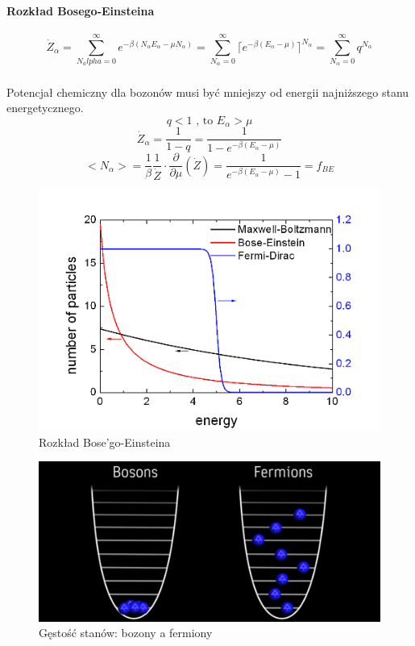 \documentclass{article}
\begin{document}
		\paragraph{Rozkład Bosego-Einsteina}
		\begin{equation}
		\dot{Z}_\alpha = \sum_{N_alpha = 0}^{\infty} e^{-\beta(N_\alpha E_\alpha - \mu N_\alpha)} = 
		\sum_{N_\alpha = 0}^{\infty} \lceil e^{-\beta (E_\alpha - \mu)} \rceil^{N_\alpha} = 
		\sum_{N_\alpha=0}^{\infty}q^{N_\alpha}
		\end{equation}
		\subparagraph{}Potencjał chemiczny dla bozonów musi być mniejszy od energii najniższego stanu energetycznego.
		\begin{equation}
		q < 1 \text{ , to } E_\alpha > \mu
		\end{equation}
		\begin{equation}
		\dot{Z}_\alpha = \frac{1}{1-q} = \frac{1}{1 - e^{-\beta (E_\alpha - \mu)}}
		\end{equation}
		\begin{equation}
		<N_\alpha> = \frac{1}{\beta}\frac{1}{\dot{Z}}\cdot \frac{\partial}{\partial \mu}(\dot{Z}) = 
		\frac{1}{e^{-\beta (E_\alpha - \mu)} - 1} = f_{BE}
		\end{equation}
		\begin{figure}[ht]
			\label{fig:fig1}
			\centering
			\includegraphics[scale=0.5]{bose_einstein.png}
			\caption{Rozkład Bose'go-Einsteina}
		\end{figure}	
		\begin{figure}[ht]
			\label{fig:fig1}
			\centering
			\includegraphics[scale=0.5]{BEC_fermi.jpg}
			\caption{Gęstość stanów: bozony a fermiony}
		\end{figure}
\end{document}
